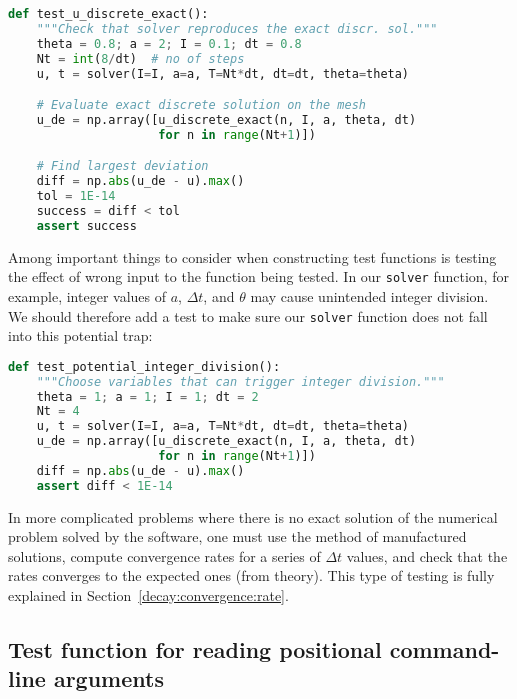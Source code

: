 \documentclass[graybox,sectrefs,envcountresetchap,open=right,final]{svmonodo}
\begin{document}
\begin{lstlisting}[language=python,style=blue1_bluegreen]
def test_u_discrete_exact():
    """Check that solver reproduces the exact discr. sol."""
    theta = 0.8; a = 2; I = 0.1; dt = 0.8
    Nt = int(8/dt)  # no of steps
    u, t = solver(I=I, a=a, T=Nt*dt, dt=dt, theta=theta)

    # Evaluate exact discrete solution on the mesh
    u_de = np.array([u_discrete_exact(n, I, a, theta, dt)
                     for n in range(Nt+1)])

    # Find largest deviation
    diff = np.abs(u_de - u).max()
    tol = 1E-14
    success = diff < tol
    assert success

\end{lstlisting}


Among important things to consider when constructing test functions
is testing the effect of wrong input to the function being tested.
In our \texttt{solver} function, for example, integer values of $a$, $\Delta t$, and
$\theta$ may cause unintended integer
division. We should therefore add a test to make sure our \texttt{solver}
function does not fall into this potential trap:











\begin{lstlisting}[language=python,style=blue1_bluegreen]
def test_potential_integer_division():
    """Choose variables that can trigger integer division."""
    theta = 1; a = 1; I = 1; dt = 2
    Nt = 4
    u, t = solver(I=I, a=a, T=Nt*dt, dt=dt, theta=theta)
    u_de = np.array([u_discrete_exact(n, I, a, theta, dt)
                     for n in range(Nt+1)])
    diff = np.abs(u_de - u).max()
    assert diff < 1E-14

\end{lstlisting}


In more complicated problems where there is no exact solution of the
numerical problem solved by the software, one must use the method
of manufactured solutions, compute convergence rates for a series
of $\Delta t$ values, and check that the rates converges to the
expected ones (from theory).
This type of testing is fully explained in
Section~\ref{decay:convergence:rate}.

\subsection{Test function for reading positional command-line arguments}
\end{document}
